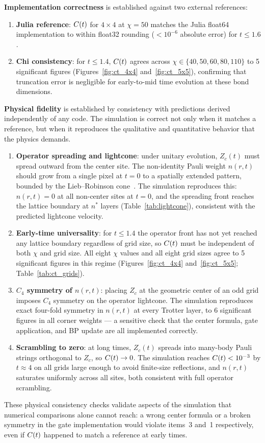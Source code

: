 \medskip
\noindent\textbf{Implementation correctness} is established against two external references:
\begin{enumerate}
 \item \textbf{Julia reference}: $C(t)$ for $4\times4$ at $\chi=50$ matches the
 Julia float64 implementation to within float32 rounding
 ($<10^{-6}$ absolute error) for $t \leq 1.6$.
 \item \textbf{Chi consistency}: for $t \leq 1.4$, $C(t)$ agrees across
 $\chi \in \{40, 50, 60, 80, 110\}$ to 5 significant figures
 (Figures~\ref{fig:ct_4x4} and~\ref{fig:ct_5x5}), confirming that truncation error is negligible
 for early-to-mid time evolution at these bond dimensions.
\end{enumerate}

\medskip
\noindent\textbf{Physical fidelity} is established by consistency with predictions
derived independently of any code.
The simulation is correct not only when it matches a reference, but when it
reproduces the qualitative and quantitative behavior that the physics demands.
\begin{enumerate}
 \item \textbf{Operator spreading and lightcone}: under unitary evolution,
 $Z_c(t)$ must spread outward from the center site.
 The non-identity Pauli weight $n(r,t)$ should grow from a single pixel
 at $t=0$ to a spatially extended pattern, bounded by the Lieb--Robinson
 cone~\citep{liebrobinson}.
 The simulation reproduces this: $n(r,t)=0$ at all non-center sites at
 $t=0$, and the spreading front reaches the lattice boundary at
 $n^*$ layers (Table~\ref{tab:lightcone}), consistent with the predicted
 lightcone velocity.
 \item \textbf{Early-time universality}: for $t \leq 1.4$ the operator front
 has not yet reached any lattice boundary regardless of grid size, so
 $C(t)$ must be independent of both $\chi$ and grid size.
 All eight $\chi$ values and all eight grid sizes agree to 5 significant
 figures in this regime (Figures~\ref{fig:ct_4x4} and~\ref{fig:ct_5x5}; Table~\ref{tab:ct_grids}).
 \item \textbf{$C_4$ symmetry of $n(r,t)$}: placing $Z_c$ at the geometric
 center of an odd grid imposes $C_4$ symmetry on the operator lightcone.
 The simulation reproduces exact four-fold symmetry in $n(r,t)$ at every
 Trotter layer, to 6 significant figures in all corner weights --- a
 sensitive check that the center formula, gate application, and BP update
 are all implemented correctly.
 \item \textbf{Scrambling to zero}: at long times, $Z_c(t)$ spreads into
 many-body Pauli strings orthogonal to $Z_c$, so $C(t) \to 0$.
 The simulation reaches $C(t) < 10^{-3}$ by $t \approx 4$ on all grids
 large enough to avoid finite-size reflections, and $n(r,t)$ saturates
 uniformly across all sites, both consistent with full operator scrambling.
\end{enumerate}
These physical consistency checks validate aspects of the simulation that
numerical comparisons alone cannot reach: a wrong center formula or a broken
symmetry in the gate implementation would violate items~3 and~1 respectively,
even if $C(t)$ happened to match a reference at early times.

